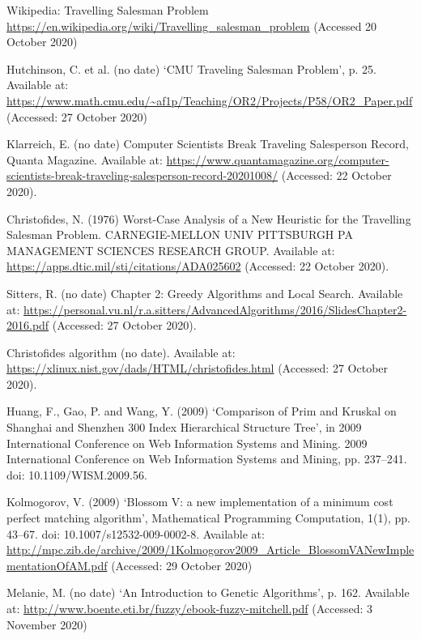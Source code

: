 \documentclass[11pt,a4paper,titlepage]{article}
\begin{document}
\begin{thebibliography}{1}

Wikipedia: Travelling Salesman Problem
\\\url{https://en.wikipedia.org/wiki/Travelling_salesman_problem} (Accessed 20 October 2020)

Hutchinson, C. et al. (no date) ‘CMU Traveling Salesman Problem’, p. 25. Available at: \url{https://www.math.cmu.edu/~af1p/Teaching/OR2/Projects/P58/OR2_Paper.pdf} (Accessed: 27 October 2020)

Klarreich, E. (no date) Computer Scientists Break Traveling Salesperson Record, Quanta Magazine. Available at: \url{https://www.quantamagazine.org/computer-scientists-break-traveling-salesperson-record-20201008/} (Accessed: 22 October 2020).

Christofides, N. (1976) Worst-Case Analysis of a New Heuristic for the Travelling Salesman Problem. CARNEGIE-MELLON UNIV PITTSBURGH PA MANAGEMENT SCIENCES RESEARCH GROUP. Available at: \url{https://apps.dtic.mil/sti/citations/ADA025602} (Accessed: 22 October 2020).

Sitters, R. (no date) Chapter 2: Greedy Algorithms and Local Search. Available at: \url{https://personal.vu.nl/r.a.sitters/AdvancedAlgorithms/2016/SlidesChapter2-2016.pdf} (Accessed: 27 October 2020).

Christofides algorithm (no date). Available at: \url{https://xlinux.nist.gov/dads/HTML/christofides.html} (Accessed: 27 October 2020).

Huang, F., Gao, P. and Wang, Y. (2009) ‘Comparison of Prim and Kruskal on Shanghai and Shenzhen 300 Index Hierarchical Structure Tree’, in 2009 International Conference on Web Information Systems and Mining. 2009 International Conference on Web Information Systems and Mining, pp. 237–241. doi: 10.1109/WISM.2009.56.

Kolmogorov, V. (2009) ‘Blossom V: a new implementation of a minimum cost perfect matching algorithm’, Mathematical Programming Computation, 1(1), pp. 43–67. doi: 10.1007/s12532-009-0002-8.
Available at: \url{http://mpc.zib.de/archive/2009/1Kolmogorov2009_Article_BlossomVANewImplementationOfAM.pdf} (Accessed: 29 October 2020)

Melanie, M. (no date) ‘An Introduction to Genetic Algorithms’, p. 162. Available at: \url {http://www.boente.eti.br/fuzzy/ebook-fuzzy-mitchell.pdf} (Accessed: 3 November 2020)

\end{thebibliography}

\begin{appendices}
\end{appendices}
\end{document}
